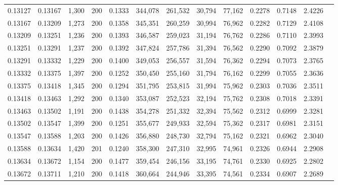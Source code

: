 \begin{tabular}{rrrrrrrrrrrrr}
0.13127 & 0.13167 & 1,300 & 200 &                                     0.1333 & 344,078 & 261,532 &  30,794 &  77,162 & 0.2278 & 0.7148 & 2.4226 \\
0.13167 & 0.13209 & 1,273 & 200 &                                     0.1358 & 345,351 & 260,259 &  30,994 &  76,962 & 0.2282 & 0.7129 & 2.4108 \\
0.13209 & 0.13251 & 1,236 & 200 &                                     0.1393 & 346,587 & 259,023 &  31,194 &  76,762 & 0.2286 & 0.7110 & 2.3993 \\
0.13251 & 0.13291 & 1,237 & 200 &                                     0.1392 & 347,824 & 257,786 &  31,394 &  76,562 & 0.2290 & 0.7092 & 2.3879 \\
0.13291 & 0.13332 & 1,229 & 200 &                                     0.1400 & 349,053 & 256,557 &  31,594 &  76,362 & 0.2294 & 0.7073 & 2.3765 \\
0.13332 & 0.13375 & 1,397 & 200 &                                     0.1252 & 350,450 & 255,160 &  31,794 &  76,162 & 0.2299 & 0.7055 & 2.3636 \\
0.13375 & 0.13418 & 1,345 & 200 &                                     0.1294 & 351,795 & 253,815 &  31,994 &  75,962 & 0.2303 & 0.7036 & 2.3511 \\
0.13418 & 0.13463 & 1,292 & 200 &                                     0.1340 & 353,087 & 252,523 &  32,194 &  75,762 & 0.2308 & 0.7018 & 2.3391 \\
0.13463 & 0.13502 & 1,191 & 200 &                                     0.1438 & 354,278 & 251,332 &  32,394 &  75,562 & 0.2312 & 0.6999 & 2.3281 \\
0.13502 & 0.13547 & 1,399 & 200 &                                     0.1251 & 355,677 & 249,933 &  32,594 &  75,362 & 0.2317 & 0.6981 & 2.3151 \\
0.13547 & 0.13588 & 1,203 & 200 &                                     0.1426 & 356,880 & 248,730 &  32,794 &  75,162 & 0.2321 & 0.6962 & 2.3040 \\
0.13588 & 0.13634 & 1,420 & 201 &                                     0.1240 & 358,300 & 247,310 &  32,995 &  74,961 & 0.2326 & 0.6944 & 2.2908 \\
0.13634 & 0.13672 & 1,154 & 200 &                                     0.1477 & 359,454 & 246,156 &  33,195 &  74,761 & 0.2330 & 0.6925 & 2.2802 \\
0.13672 & 0.13711 & 1,210 & 200 &                                     0.1418 & 360,664 & 244,946 &  33,395 &  74,561 & 0.2334 & 0.6907 & 2.2689 \\

\end{tabular}
